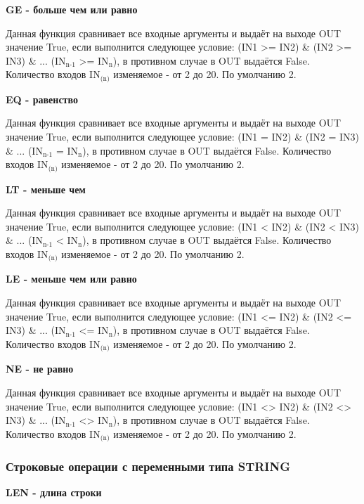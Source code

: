 \documentclass[letterpaper,10pt,russian]{sphinxmanual}
\begin{document}
\textbf{GE - больше чем или равно}

Данная функция сравнивает все входные аргументы и выдаёт на выходе OUT
значение True, если выполнится следующее условие: (IN1 \textgreater{}= IN2) \& (IN2 \textgreater{}=
IN3) \& ... (IN$_{\text{n-1}}$ \textgreater{}= IN$_{\text{n}}$), в противном случае в OUT
выдаётся False. Количество входов IN$_{\text{(n)}}$ изменяемое - от 2 до
20. По умолчанию 2.

\textbf{EQ - равенство}

Данная функция сравнивает все входные аргументы и выдаёт на выходе OUT
значение True, если выполнится следующее условие: (IN1 = IN2) \& (IN2 =
IN3) \& ... (IN$_{\text{n-1}}$ = IN$_{\text{n}}$), в противном случае в OUT
выдаётся False. Количество входов IN$_{\text{(n)}}$ изменяемое - от 2 до
20. По умолчанию 2.

\textbf{LT - меньше чем}

Данная функция сравнивает все входные аргументы и выдаёт на выходе OUT
значение True, если выполнится следующее условие: (IN1 \textless{} IN2) \& (IN2 \textless{}
IN3) \& ... (IN$_{\text{n-1}}$ \textless{} IN$_{\text{n}}$), в противном случае в OUT выдаётся
False. Количество входов IN$_{\text{(n)}}$ изменяемое - от 2 до 20. По
умолчанию 2.

\textbf{LE - меньше чем или равно}

Данная функция сравнивает все входные аргументы и выдаёт на выходе OUT
значение True, если выполнится следующее условие: (IN1 \textless{}= IN2) \& (IN2 \textless{}=
IN3) \& ... (IN$_{\text{n-1}}$ \textless{}= IN$_{\text{n}}$), в противном случае в OUT выдаётся
False. Количество входов IN$_{\text{(n)}}$ изменяемое - от 2 до 20. По
умолчанию 2.

\textbf{NE - не равно}

Данная функция сравнивает все входные аргументы и выдаёт на выходе OUT
значение True, если выполнится следующее условие: (IN1 \textless{}\textgreater{} IN2) \& (IN2 \textless{}\textgreater{}
IN3) \& ... (IN$_{\text{n-1}}$ \textless{}\textgreater{} IN$_{\text{n}}$), в противном случае в OUT
выдаётся False. Количество входов IN$_{\text{(n)}}$ изменяемое - от 2 до 20. По
умолчанию 2.


\subsubsection{Строковые операции с переменными типа STRING}
\label{usage_guide/library:string}
\textbf{LEN - длина строки}
\end{document}
